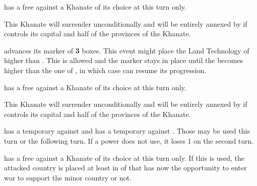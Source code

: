 \phdipl
\aparag \RUS has a free \CB against a Khanate of its choice at this turn only.

\phpaix
\aparag This Khanate will surrender unconditionally and will be entirely
annexed by \RUS if \RUS controls its capital and half of the provinces of the
Khanate.






\phevnt
\aparag \RUS advances its  marker of {\bf 3}
boxes. This event might place the Land Technology of \RUS higher than
 . This is allowed and the marker stays
in place until the   becomes higher
than the one of \RUS, in which case \RUS can resume its progression.

\phdipl
\aparag \RUS has a free \CB against a Khanate of its choice at this turn only.

\phpaix
\aparag This Khanate will surrender unconditionally and will be entirely
annexed by \RUS if \RUS controls its capital and half of the provinces of the
Khanate.






\phevnt
\aparag \RUS has a temporary \CB against \POL and \POL has a temporary \CB
against \RUS. Those \CB may be used this turn or the following turn. If a
power does not use, it loses 1 \STAB on the second turn.






\phdipl
\aparag \RUS has a free \CB against a Khanate of its choice at this turn only.
\aparag If this \CB is used, the attacked country is placed at least in \AM of
\TUR that has now the opportunity to enter war to support the minor country or
not.

